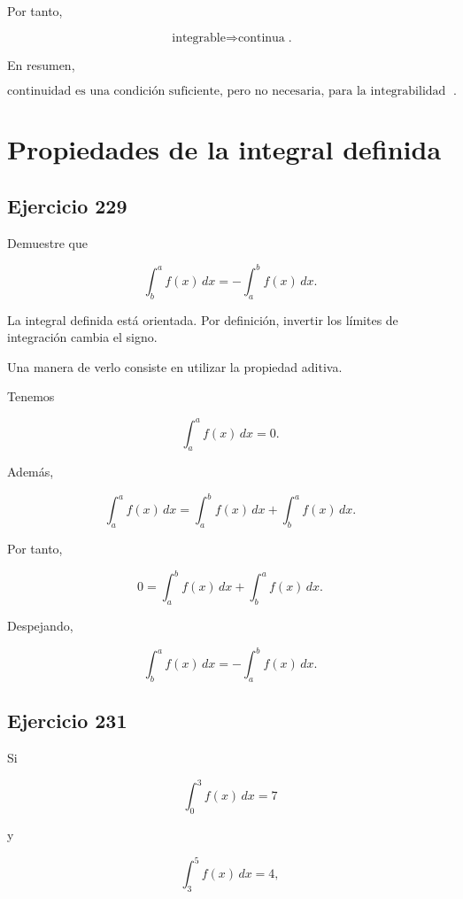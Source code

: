 \documentclass[12pt]{article}
\begin{document}
Por tanto,

\[
\boxed{
\text{integrable}
\Longrightarrow
\text{continua}
}.
\]

En resumen,

\[
\boxed{
\text{continuidad es una condición suficiente, pero no necesaria,
para la integrabilidad de Riemann}
}.
\]

\section*{Propiedades de la integral definida}

\subsection*{Ejercicio 229}

Demuestre que

\[
\int_b^a f(x)\,dx
=
-\int_a^b f(x)\,dx.
\]

La integral definida está orientada. Por definición, invertir los
límites de integración cambia el signo.

Una manera de verlo consiste en utilizar la propiedad aditiva.

Tenemos

\[
\int_a^a f(x)\,dx=0.
\]

Además,

\[
\int_a^a f(x)\,dx
=
\int_a^b f(x)\,dx
+
\int_b^a f(x)\,dx.
\]

Por tanto,

\[
0
=
\int_a^b f(x)\,dx
+
\int_b^a f(x)\,dx.
\]

Despejando,

\[
\boxed{
\int_b^a f(x)\,dx
=
-\int_a^b f(x)\,dx
}.
\]

\subsection*{Ejercicio 231}

Si

\[
\int_0^3f(x)\,dx=7
\]

y

\[
\int_3^5f(x)\,dx=4,
\]
\end{document}
